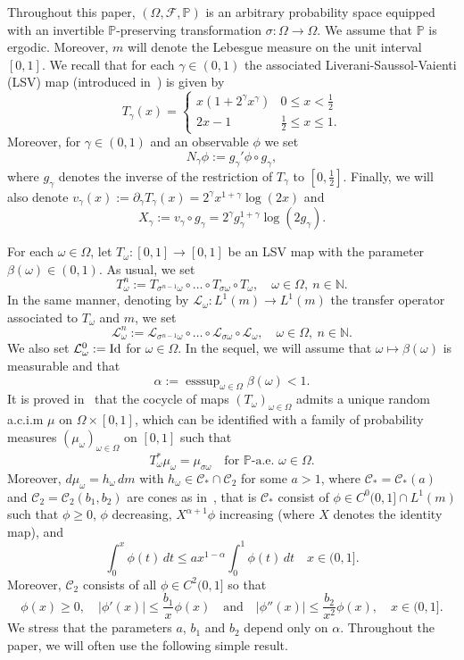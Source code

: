 \documentclass[12pt,reqno,a4paper]{article}
\def\Id{\text{\rm Id}}
\DeclareMathOperator{\esssup}{esssup}
\begin{document}
	Throughout this paper, $(\Omega, \mathcal F, \mathbb P)$ is an arbitrary probability space equipped with an invertible $\mathbb P$-preserving transformation $\sigma \colon \Omega \to \Omega$. We assume that $\mathbb P$ is ergodic. Moreover, $m$ will denote the Lebesgue measure on the unit interval $[0, 1]$. We recall that for each
	$\gamma \in (0, 1)$ the associated Liverani-Saussol-Vaienti (LSV) map (introduced in~\cite{LSV}) is given by 
	\[
	T_\gamma(x)=\begin{cases}
		x(1+2^\gamma x^\gamma) & 0\le x<\frac 1 2 \\
		2x-1 & \frac 1 2 \le x\le 1.
	\end{cases}
	\]
	Moreover, for $\gamma \in (0, 1)$ and an observable $\phi$ we set
	\[
	N_\gamma\phi:= g_\gamma'\phi\circ g_\gamma,
	\]
	where $g_\gamma$ denotes the inverse of the restriction of $T_\gamma$ to $[0, \frac 1 2]$. Finally,  we will also denote $v_\gamma(x):=\partial_\gamma T_\gamma(x)=2^\gamma x^{1+\gamma}\log(2x)$ and \[
	X_\gamma:=v_\gamma\circ g_\gamma=2^\gamma g_\gamma^{1+\gamma}\log(2g_\gamma).
	\]
	
	For each $\omega \in \Omega$, let $T_\omega  \colon [0, 1] \to [0, 1]$ be an LSV map with the parameter $\beta (\omega) \in (0, 1)$.  As usual, we set 
	\[
	T_\omega^n:=T_{\sigma^{n-1}\omega}\circ \ldots \circ T_{\sigma \omega}\circ T_\omega, \quad \omega \in \Omega,  \ n\in \mathbb N.
	\]
	In the same manner, denoting by $\mathcal L_\omega \colon L^1(m)\to L^1(m)$ the transfer operator associated to $T_\omega$ and $m$, we set 
	\[
	\mathcal L_\omega^n:=\mathcal L_{\sigma^{n-1}\omega}\circ \ldots \circ \mathcal L_{\sigma \omega}\circ \mathcal L_\omega, \quad \omega \in \Omega,  \ n\in \mathbb N.
	\]
	We also set $\mathcal L_\omega^0 :=\Id$ for $\omega \in \Omega$.
	In the sequel, we will assume that $\omega \mapsto \beta (\omega)$ is measurable and that 
	\[
	\alpha:=\esssup_{\omega \in \Omega}\beta(\omega)< 1.
	\]
	It is proved in~\cite[Proposition 9]{DGTS} that the cocycle of maps $(T_\omega)_{\omega \in \Omega}$ admits a unique random a.c.i.m $\mu$ on $\Omega \times [0, 1]$, which can be identified with a family of probability measures $(\mu_\omega)_{\omega \in \Omega}$ on $[0, 1]$ such that
	\[
	T_\omega^*\mu_\omega=\mu_{\sigma \omega} \quad \text{for $\mathbb P$-a.e. $\omega \in \Omega$.}
	\]
	Moreover, $d\mu_\omega=h_\omega \, dm$ with $h_\omega \in \mathcal C_*\cap \mathcal C_2$ for some $a>1$, where $\mathcal C_*=\mathcal C_*(a)$ and $\mathcal C_2=\mathcal C_2(b_1, b_2)$ are cones as in~\cite[Section 2.2]{DGTS}, that is $\mathcal C_*$ consist of  $\phi \in C^0(0, 1]\cap L^1(m)$ such that $\phi \ge 0$, $\phi$ decreasing, $X^{\alpha+1}\phi$ increasing (where $X$ denotes the identity map), and 
	\[
	\int_0^x \phi (t)\, dt\le ax^{1-\alpha}\int_0^1 \phi (t)\, dt \quad x\in (0, 1].
	\]
	Moreover, $\mathcal C_2$ consists of all $\phi \in C^2(0, 1]$ so that
	\[
	\phi (x)\ge 0, \quad |\phi'(x)| \le \frac{b_1}{x}\phi(x) \quad \text{and} \quad |\phi''(x)| \le \frac{b_2}{x^2}\phi(x), \quad x\in (0, 1].
	\]
	We stress that the parameters $a$, $b_1$ and $b_2$ depend only on $\alpha$. Throughout the paper, we will often use the following simple result.
	
\end{document}

